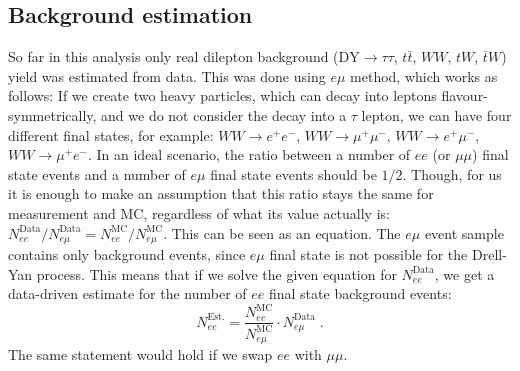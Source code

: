 \documentclass[a0,portrait]{a0poster}
\begin{document}
\begin{multicols}{2}
\section*{Background estimation}
So far in this analysis only real dilepton background ($\mathrm{DY}\rightarrow\tau\tau$, $t\bar{t}$, $WW$, $tW$,
$\bar{t}W$) yield was estimated from data.
This was done using $e\mu$ method, which works as follows:
If we create two heavy particles, which can decay into leptons flavour-symmetrically, and we do
not consider the decay into a $\tau$ lepton, we can have four different final states, for example: $WW\rightarrow e^{+}e^{-}$,
$WW\rightarrow \mu^{+}\mu^{-}$, $WW\rightarrow e^{+}\mu^{-}$, $WW\rightarrow \mu^{+}e^{-}$.
In an ideal scenario, the ratio between a number of $ee$ (or $\mu\mu$) final state events and a number of $e\mu$ final state
events should be $1/2$.
Though, for us it is enough to make an assumption that this ratio stays the same for measurement and MC, regardless of
what its value actually is: $N_{ee}^{\mathrm{Data}}/N_{e\mu}^{\mathrm{Data}}=N_{ee}^{\mathrm{MC}}/N_{e\mu}^{\mathrm{MC}}$.
This can be seen as an equation.
The $e\mu$ event sample contains only background events, since $e\mu$ final state is not possible for the Drell-Yan process.
This means that if we solve the given equation for $N_{ee}^{\mathrm{Data}}$, we get a data-driven estimate for the number
of $ee$ final state background events:
\begin{equation}
	\label{eq:EMuMethod}
	N_{ee}^{\mathrm{Est.}}=\frac{N_{ee}^{\mathrm{MC}}}{N_{e\mu}^{\mathrm{MC}}}\cdot N_{e\mu}^{\mathrm{Data}} \; .
\end{equation}
The same statement would hold if we swap $ee$ with $\mu\mu$.


\end{multicols}
\end{document}
